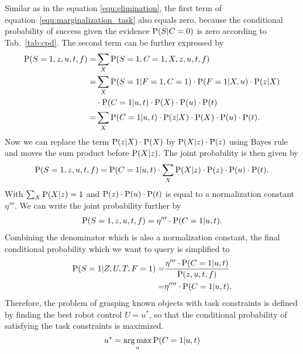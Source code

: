 Similar as in the equation \ref{equ:elimination}, the first term of equation~\ref{equ:marginalization_task} also equals zero, because the conditional probability of success given the evidence $\operatorname*{\text{P}}(S|C=0)$ is zero according to Tab.~\ref{tab:cpd}. The second term can be further expressed by   
\begin{equation}
\begin{split}
 \operatorname*{\text{P}}(S = 1, z, u, t, f)  = & \sum_{X} \operatorname*{\text{P}}(S=1,C=1,X,z,u,t,f)  \\
 					    =& \sum_{X} \operatorname*{\text{P}} (S=1|F=1,C=1) \cdot \operatorname*{\text{P}}(F = 1|X,u)\cdot\operatorname*{\text{P}}(z|X) \\
 					     &\cdot \operatorname*{\text{P}}(C=1|u,t) \cdot \operatorname*{\text{P}}(X) \cdot \operatorname*{\text{P}}(u) \cdot \operatorname*{\text{P}}(t) \\
 					    =&\sum_{X} \operatorname*{\text{P}}(C=1|u,t) \cdot\operatorname*{\text{P}}(z|X) \cdot \operatorname*{\text{P}}(X) \cdot \operatorname*{\text{P}}(u) \cdot \operatorname*{\text{P}}(t). \\ 
\end{split}
\end{equation}
Now we can replace the term $\operatorname*{\text{P}}(z|X) \cdot \operatorname*{\text{P}}(X)$ by  $\operatorname*{\text{P}}(X|z)\cdot\operatorname*{\text{P}}(z)$ using Bayes rule and moves the sum product before $\operatorname*{\text{P}}(X|z)$. The joint probability is then given by  
\begin{equation}
\begin{split}
 \operatorname*{\text{P}}(S = 1, z, u, t, f) = \operatorname*{\text{P}}(C=1|u,t) \cdot \sum_{X} \operatorname*{\text{P}}(X|z)\cdot\operatorname*{\text{P}}(z) \cdot \operatorname*{\text{P}}(u) \cdot \operatorname*{\text{P}}(t).
\end{split}              
\end{equation}
With $\sum_{X} \operatorname*{\text{P}}(X|z) = 1$ and $\operatorname*{\text{P}}(z) \cdot \operatorname*{\text{P}}(u) \cdot \operatorname*{\text{P}}(t)$ is equal to a normalization constant $\eta'''$. We can write the joint probability further by 
\begin{equation}
\begin{split}
 \operatorname*{\text{P}}(S = 1, z, u, t, f) = \eta''' \cdot  \operatorname*{\text{P}}(C=1|u,t). 
\end{split}              
\end{equation}
Combining the denominator which is also a normalization constant, the final conditional probability which we want to query is simplified to 
\begin{equation}
\begin{split}
 \operatorname*{\text{P}}(S = 1 | Z, U, T, F  = 1) =& \frac{\eta''' \cdot  \operatorname*{\text{P}}(C=1|u,t)}{\operatorname*{\text{P}}(z,u,t,f)} \\
     						  =& \eta'''' \cdot  \operatorname*{\text{P}}(C=1 | u,t). 
\end{split}              
\end{equation}
Therefore, the problem of grasping known objects with task constraints is defined by finding the best robot control $U=u^*$, so that the conditional probability of satisfying the task constraints is maximized.  
\begin{equation}
  u^* = \operatorname*{arg\,max}_{u} \operatorname*{\text{P}}(C=1 | u,t)  
\end{equation}

